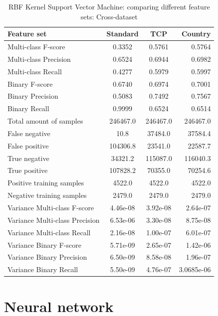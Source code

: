 \begin{table}[H]
\caption{RBF Kernel Support Vector Machine: comparing different feature sets: Cross-dataset}
\label{tab:svm:cross}
\centering
\begin{tabular}{l c c r}
\toprule
Feature set & Standard & TCP & Country \\
\midrule
Multi-class F-score & 0.3352 & 0.5761 & 0.5764 \\
Multi-class Precision & 0.6524 & 0.6944 & 0.6982 \\
Multi-class Recall & 0.4277 & 0.5979 & 0.5997 \\
\midrule
Binary F-score & 0.6740 & 0.6974 & 0.7001 \\
Binary Precision & 0.5083 & 0.7492 & 0.7567 \\
Binary Recall & 0.9999 & 0.6524 & 0.6514 \\
\midrule
Total amount of samples & 246467.0 & 246467.0 & 246467.0 \\
False negative & 10.8 & 37484.0 & 37584.4 \\
False positive & 104306.8 & 23541.0 & 22587.7 \\
True negative & 34321.2 & 115087.0 & 116040.3 \\
True positive & 107828.2 & 70355.0 & 70254.6 \\
\midrule
Positive training samples & 4522.0 & 4522.0 & 4522.0\\
Negative training samples & 2479.0 & 2479.0 & 2479.0\\
\midrule
Variance Multi-class F-score & 4.46e-08 & 3.92e-08 & 2.64e-07\\
Variance Multi-class Precision & 6.53e-06 & 3.30e-08 & 8.75e-08 \\
Variance Multi-class Recall & 2.16e-08 & 1.00e-07 & 6.01e-07  \\
\midrule
Variance Binary F-score & 5.71e-09 &  2.65e-07 & 1.42e-06\\
Variance Binary Precision & 6.50e-09 & 8.58e-08 & 1.96e-07 \\
Variance Binary Recall & 5.50e-09  & 4.76e-07 & 3.0685e-06 \\
\bottomrule
\end{tabular}
\end{table}

\newpage
\section{Neural network}

